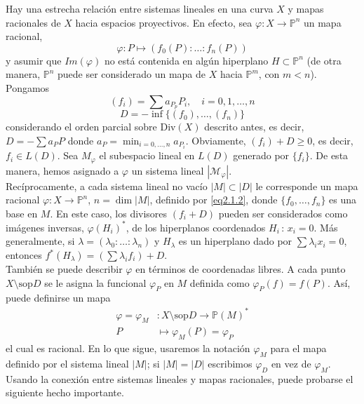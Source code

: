 \documentclass[12pt,a4paper]{report}
\newcommand{\sop}{\mbox{sop}}
\newcommand{\ep}{\mathbb{P}^{n}}
\newcommand{\M}{\mathscr{M}}
\begin{document}
Hay una estrecha relación entre sistemas lineales en una curva $X$ y mapas racionales de $X$ hacia espacios proyectivos. En efecto, sea $\varphi : X \rightarrow \ep$ un mapa racional,
\begin{equation}\label{eq2.1.2}
\varphi : P \mapsto (f_{0}(P): \ldots : f_{n}(P))
\end{equation}
y asumir que $Im(\varphi)$ no está contenida en algún hiperplano $H \subset \ep $ (de otra manera, $\ep$ puede ser considerado un mapa de $X$ hacia $\mathbb{P}^{m}$, con $m < n$). Pongamos
$$ (f_{i}) = \sum a_{P_{p}} P_{i},  \quad  i= 0, 1, \ldots , n$$
$$ D= - \inf \{ (f_{0}), \ldots , (f_{n}) \} $$
considerando el orden parcial sobre $\mbox{Div}(X)$ descrito antes, es decir, $D=- \sum a_{P}P$ donde $a_{P}= \min_{i=0, \ldots, n}a_{P_{i}} $. Obviamente, $(f_{i})+ D \geqslant 0$, es decir, $ f_{i} \in L(D)$. Sea $M_{\varphi}$ el subespacio lineal en $L(D)$ generado por $\{f_{i}\}$. De esta manera, hemos asignado a $\varphi$ un sistema lineal $|\M_{\varphi}|$. \\
Recíprocamente, a cada sistema lineal no vacío $|M| \subset |D|$ le corresponde un mapa racional $\varphi : X \rightarrow \ep$, $n =\dim |M|$, definido por \ref{eq2.1.2}, donde $\{ f_{0},  \ldots , f_{n} \}$ es una base en $M$. En este caso, los divisores $(f_{i}+D)$ pueden ser considerados como imágenes inversas, $\varphi (H_{i})^{*}$, de los hiperplanos coordenados $H_{i}\, :\, x_{i}=0 $. Más generalmente, si $\lambda =(\lambda_{0}:  \ldots : \lambda_{n})$ y $H_{\lambda}$ es un hiperplano dado por $\sum \lambda_{i} x_{i}=0$, entonces $f^{*}(H_{\lambda})= (\sum \lambda_{i} f_{i}) +D$.\\

También se puede describir $\varphi$ en términos de coordenadas libres. A cada punto $X \setminus \sop D$ se le asigna la funcional $\varphi_{P} $ en $M$ definida como $\varphi_{P}(f) = f(P)$. Así, puede definirse un mapa $$ \begin{array}{rl}
\varphi = \varphi _{M} \! & :  X \setminus \sop D  \longrightarrow \mathbb{P} (M)^{*}\\
              P \! & \mapsto  \varphi_{M} (P) = \varphi_{P}
\end{array}$$ 
el cual es racional. En lo que sigue, usaremos la notación $\varphi_{M}$ para el mapa definido por el sistema lineal $|M|$; si $|M| = |D|$ escribimos $\varphi _{D}$  en vez de $\varphi_{M}$. \\
Usando la conexión entre sistemas lineales y mapas racionales, puede probarse el siguiente hecho importante.
\end{document}
